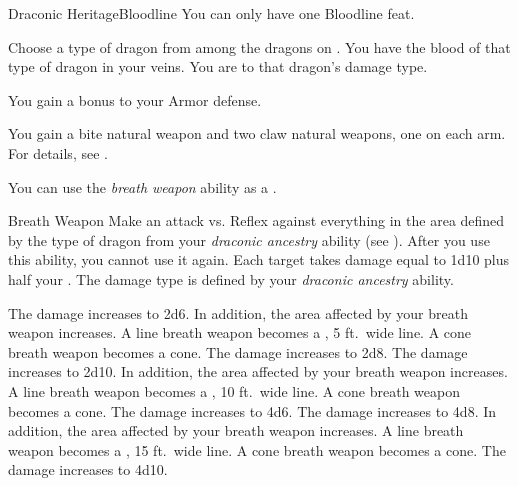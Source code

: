     \begin{feat}{Draconic Heritage}{Bloodline}
         You can only have one Bloodline feat.

         Choose a type of dragon from among the dragons on .
        You have the blood of that type of dragon in your veins.
        You are  to that dragon's damage type.

         You gain a  bonus to your Armor defense.

         You gain a bite natural weapon and two claw natural weapons, one on each arm.
        For details, see .

         You can use the \textit{breath weapon} ability as a .
        \begin{activeability}{Breath Weapon}
            \rankline
            Make an attack vs. Reflex against everything in the area defined by the type of dragon from your \textit{draconic ancestry} ability (see ).
            After you use this ability, you  cannot use it again.
            \hit Each target takes damage equal to 1d10 plus half your .
            The damage type is defined by your \textit{draconic ancestry} ability.

            \rankline
             The damage increases to 2d6.
                In addition, the area affected by your breath weapon increases.
                A line breath weapon becomes a \arealarge, 5 ft.\ wide line.
                A cone breath weapon becomes a \areamed cone.
             The damage increases to 2d8.
             The damage increases to 2d10.
                In addition, the area affected by your breath weapon increases.
                A line breath weapon becomes a \areahuge, 10 ft.\ wide line.
                A cone breath weapon becomes a \arealarge cone.
             The damage increases to 4d6.
             The damage increases to 4d8.
                In addition, the area affected by your breath weapon increases.
                A line breath weapon becomes a \areagarg, 15 ft.\ wide line.
                A cone breath weapon becomes a \areahuge cone.
             The damage increases to 4d10.
        \end{activeability}


\end{feat}
